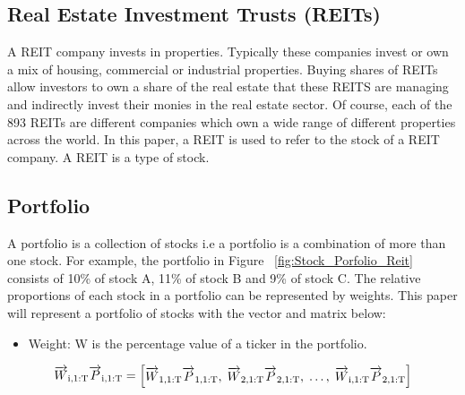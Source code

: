 \documentclass[a4paper,12pt]{report}
\numberwithin{equation}{section}
\theoremstyle{definition}
\begin{document}
\subsection{Real Estate Investment Trusts (REITs)}
A REIT company invests in properties. Typically these companies invest or own a mix of housing, commercial or industrial properties. Buying shares of REITs allow investors to own a share of the real estate that these REITS are managing and indirectly invest their monies in the real estate sector. Of course, each of the 893 REITs are different companies which own a wide range of different properties across the world. In this paper, a REIT is used to refer to the stock of a REIT company. A REIT is a type of stock.

\subsection{Portfolio}
A portfolio is a collection of stocks i.e a portfolio is a combination of more than one stock. For example, the portfolio in Figure ~\ref{fig:Stock_Porfolio_Reit} consists of 10\% of stock A, 11\% of stock B and 9\% of stock C. The relative proportions of each stock in a portfolio can be represented by weights. This paper will represent a portfolio of stocks with the vector and matrix below:
\begin{itemize}

  \item {Weight: W is the percentage value of a ticker in the portfolio.}
  
\end{itemize}


\begin{equation*}
  \overrightarrow{W}\textsubscript{i,1:T}\overrightarrow{P}\textsubscript{i,1:T} = 
  \begin{bmatrix}
    \overrightarrow{W}\textsubscript{1,1:T}\overrightarrow{P}\textsubscript{1,1:T},\;
    \overrightarrow{W}\textsubscript{2,1:T}\overrightarrow{P}\textsubscript{2,1:T},\;
    \ldots,\;
    \overrightarrow{W}\textsubscript{i,1:T}\overrightarrow{P}\textsubscript{2,1:T}
  \end{bmatrix}
\end{equation*}
\end{document}
